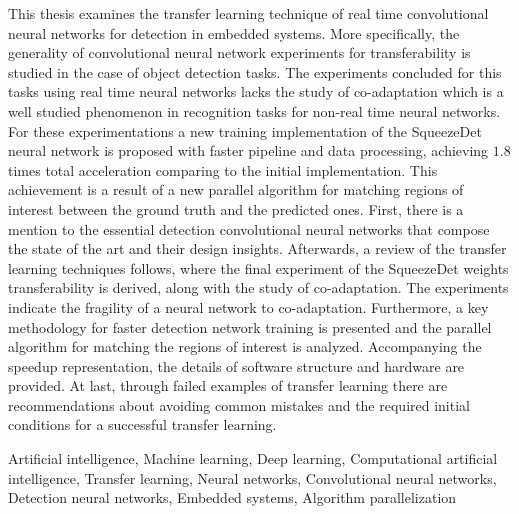 \begin{abstracteng}
This thesis examines the transfer learning technique of real time convolutional neural networks for detection in embedded systems. More specifically, the generality of convolutional neural network experiments for transferability is studied in the case of object detection tasks. The experiments concluded for this tasks using real time neural networks lacks the study of co-adaptation which is a well studied phenomenon in recognition tasks for non-real time neural networks. For these experimentations a new training implementation of the SqueezeDet neural network is proposed with faster pipeline and data processing, achieving $1.8$ times total acceleration comparing to the initial implementation. This achievement is a result of a new parallel algorithm for matching regions of interest between the ground truth and the predicted ones. First, there is a mention to the essential detection convolutional neural networks that compose the state of the art and their design insights. Afterwards, a review of the transfer learning techniques follows, where the final experiment of the SqueezeDet weights transferability is derived, along with the study of co-adaptation. The experiments indicate the fragility of a neural network to co-adaptation. Furthermore, a key methodology for faster detection network training is presented and the parallel algorithm for matching the regions of interest is analyzed. Accompanying the speedup representation, the details of software structure and hardware are provided. At last, through failed examples of transfer learning there are recommendations about avoiding common mistakes and the required initial conditions for a successful transfer learning.


  \begin{keywordseng}
  Artificial intelligence, Machine learning, Deep learning, Computational artificial intelligence, Transfer learning, Neural networks, Convolutional neural networks, Detection neural networks, Embedded systems, Algorithm parallelization
  \end{keywordseng}

\end{abstracteng}


